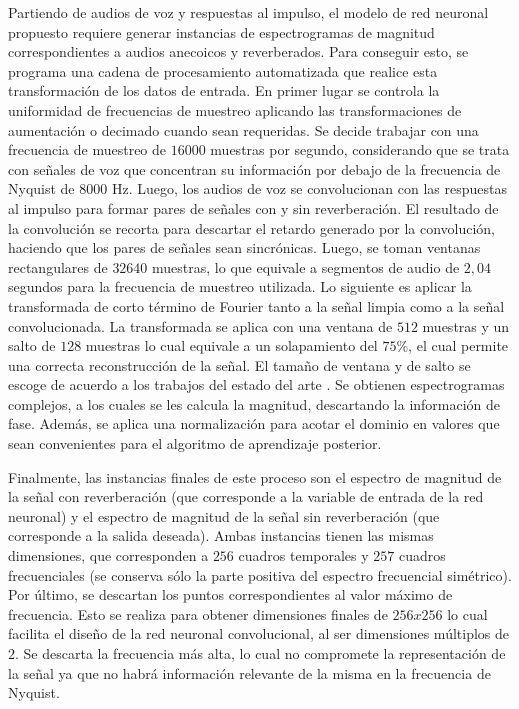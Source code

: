 Partiendo de audios de voz y respuestas al impulso, el modelo de red neuronal propuesto requiere generar instancias de espectrogramas de magnitud correspondientes a audios anecoicos y reverberados. Para conseguir esto, se programa una cadena de procesamiento automatizada que realice esta transformación de los datos de entrada. 
En primer lugar se controla la uniformidad de frecuencias de muestreo aplicando las transformaciones de aumentación o decimado cuando sean requeridas. Se decide trabajar con una frecuencia de muestreo de $16000$ muestras por segundo, considerando que se trata con señales de voz que concentran su información por debajo de la frecuencia de Nyquist de $8000$ Hz. 
Luego, los audios de voz se convolucionan con las respuestas al impulso para formar pares de señales con y sin reverberación. El resultado de la convolución se recorta para descartar el retardo generado por la convolución, haciendo que los pares de señales sean sincrónicas. Luego, se toman ventanas rectangulares de $32640$ muestras, lo que equivale a segmentos de audio de $2,04$ segundos para la frecuencia de muestreo utilizada. Lo siguiente es aplicar la transformada de corto término de Fourier tanto a la señal limpia como a la señal convolucionada. La transformada se aplica con una ventana de $512$ muestras y un salto de $128$ muestras lo cual equivale a un solapamiento del $75\%$, el cual permite una correcta reconstrucción de la señal. El tamaño de ventana y de salto se escoge de acuerdo a los trabajos del estado del arte \cite{rir_filtinverso, FCN}. Se obtienen espectrogramas complejos, a los cuales se les calcula la magnitud, descartando la información de fase. Además, se aplica una normalización para acotar el dominio en valores que sean convenientes para el algoritmo de  aprendizaje posterior. 

Finalmente, las instancias finales de este proceso son el espectro de magnitud de la señal con reverberación (que corresponde a la variable de entrada de la red neuronal) y el espectro de magnitud de la señal sin reverberación (que corresponde a la salida deseada). Ambas instancias tienen las mismas dimensiones, que corresponden a $256$ cuadros temporales y $257$ cuadros frecuenciales (se conserva sólo la parte positiva del espectro frecuencial simétrico). Por último, se descartan los puntos correspondientes al valor máximo de frecuencia. Esto se realiza para obtener dimensiones finales de $256x256$ lo cual facilita el diseño de la red neuronal convolucional, al ser dimensiones múltiplos de $2$. Se descarta la frecuencia más alta, lo cual no compromete la representación de la señal ya que no habrá información relevante de la misma en la frecuencia de Nyquist.

